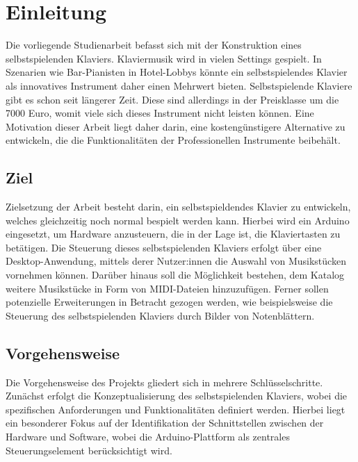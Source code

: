 \chapter{Einleitung} \label{einleitung}

\nocite{*}

Die vorliegende Studienarbeit befasst sich mit der Konstruktion eines selbstspielenden Klaviers.
Klaviermusik wird in vielen Settings gespielt.
In Szenarien wie Bar-Pianisten in Hotel-Lobbys könnte ein selbstspielendes
Klavier als innovatives Instrument daher einen Mehrwert bieten. \newline
Selbstspielende Klaviere gibt es schon seit längerer Zeit. Diese sind allerdings in der Preisklasse um die 7000
Euro, womit viele sich dieses Instrument nicht leisten können.
Eine Motivation dieser Arbeit liegt daher darin, eine kostengünstigere Alternative zu entwickeln, die die
Funktionalitäten der Professionellen Instrumente beibehält.


\section{Ziel} \label{einleitung-ziel}

Zielsetzung der Arbeit besteht darin, ein selbstspieldendes Klavier zu entwickeln, welches gleichzeitig
noch normal bespielt werden kann. Hierbei wird ein Arduino eingesetzt, um Hardware anzusteuern, die in der
Lage ist, die Klaviertasten zu betätigen. Die Steuerung dieses selbstspielenden Klaviers erfolgt über eine
Desktop-Anwendung, mittels derer Nutzer:innen die Auswahl von Musikstücken vornehmen können. Darüber hinaus
soll die Möglichkeit bestehen, dem Katalog weitere Musikstücke in Form von MIDI-Dateien hinzuzufügen. Ferner
sollen potenzielle Erweiterungen in Betracht gezogen werden, wie beispielsweise die Steuerung des
selbstspielenden Klaviers durch Bilder von Notenblättern.


\section{Vorgehensweise} \label{einleitung-vorgehen}
Die Vorgehensweise des Projekts gliedert sich in mehrere Schlüsselschritte. Zunächst erfolgt die
Konzeptualisierung des selbstspielenden Klaviers, wobei die spezifischen Anforderungen und Funktionalitäten
definiert werden. Hierbei liegt ein besonderer Fokus auf der Identifikation der Schnittstellen zwischen der
Hardware und Software, wobei die Arduino-Plattform als zentrales Steuerungselement berücksichtigt wird. \newline

